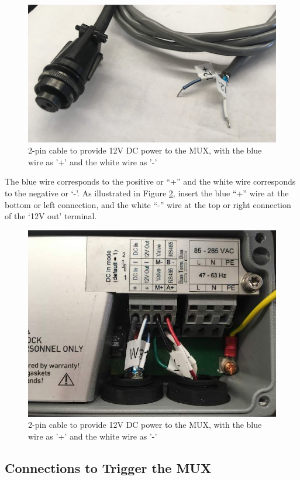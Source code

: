 \documentclass[]{book}
\begin{document}
\begin{figure}

{\centering \includegraphics[width=0.7\linewidth]{pictures/2-pin-cable} 

}

\caption{2-pin cable to provide 12V DC power to the MUX, with the blue wire as '+' and the white wire as '-'}\label{fig:2-pin-cable}
\end{figure}

The blue wire corresponds to the positive or ``+'' and the white wire corresponds to the negative or `-'. As illustrated in Figure \ref{fig:ConnectBox1}, insert the blue ``+'' wire at the bottom or left connection, and the white ``-'' wire at the top or right connection of the `12V out' terminal.

\begin{figure}

{\centering \includegraphics[width=0.7\linewidth]{pictures/ConnectBox1} 

}

\caption{2-pin cable to provide 12V DC power to the MUX, with the blue wire as '+' and the white wire as '-'}\label{fig:ConnectBox1}
\end{figure}

\hypertarget{connections-to-trigger-the-mux}{%
\subsection{Connections to Trigger the MUX}\label{connections-to-trigger-the-mux}}
\end{document}

